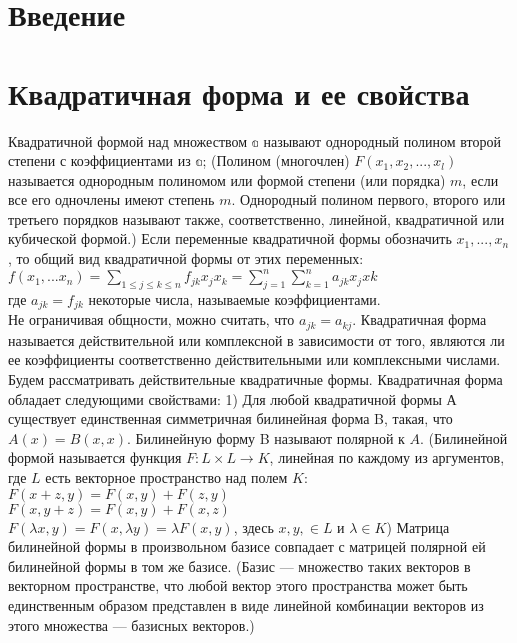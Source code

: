 \documentclass[a4paper,14pt]{report}
\author{Sharov Alex}
\newcommand\tab[1][1cm]{\hspace*{#1}}
\newcommand{\udsum}[3]{\sum\limits_{#1}^{#2}{#3}}
\newcommand{\dsum}[2]{\sum\limits_{#1}{#2}}
\newcommand{\tl}{\newline\tab}
\begin{document}
 
\setcounter{tocdepth}{1}

\tableofcontents

\section{Введение}

\section{Квадратичная форма и ее свойства}

\tab Квадратичной формой над множеством $\mathds{a}$ называют однородный полином второй степени с коэффициентами из $\mathds{a}$;
\tl
(Полином (многочлен) $F(x_1,x_2,...,x_l)$ называется однородным полиномом или формой степени (или порядка) $m$, если все его одночлены имеют степень $m$. Однородный полином первого, второго или третьего порядков называют также, соответственно, линейной, квадратичной или кубической формой.)
\tl
Если переменные квадратичной формы обозначить $x_1,...,x_n$, то общий вид квадратичной формы от этих переменных:
\\
$f(x_1,...x_n)=\dsum{1 \le j \le k \le n}{f_{jk}x_jx_k} = \udsum{j=1}{n}{}\udsum{k=1}{n}{a_{jk}x_{j}x{k}}$
\\ \tab где $a_{jk} = f_{jk}$ некоторые числа, называемые коэффициентами.
\\
Не ограничивая общности, можно считать, что $a_{jk} = a_{kj}$. Квадратичная форма называется действительной или комплексной в зависимости от того, являются ли ее коэффициенты соответственно действительными или комплексными числами. Будем рассматривать действительные квадратичные формы.
\tl 
Квадратичная форма обладает следующими свойствами:
\tl
1) Для любой квадратичной формы $А$ существует единственная симметричная билинейная форма B, такая, что $A(x) = B(x, x)$. Билинейную форму B называют полярной к $A$. 
\tl
(Билинейной формой называется функция $F:L \times L \to K$, линейная по каждому из аргументов, где $L$ есть векторное пространство над полем $K$: \\
\tab $F(x+z,y)=F(x,y)+F(z,y)$ \\
\tab $F(x,y+z)=F(x,y)+F(x,z)$ \\
\tab $F(\lambda x,y)= F(x,\lambda y) = \lambda F(x,y)$, здесь $x,y,\in L$ и $\lambda \in K$)
\tl
Матрица билинейной формы в произвольном базисе совпадает с матрицей полярной ей билинейной формы в том же базисе.
\tl
(Базис — множество таких векторов в векторном пространстве, что любой вектор этого пространства может быть единственным образом представлен в виде линейной комбинации векторов из этого множества — базисных векторов.)
\end{document}
